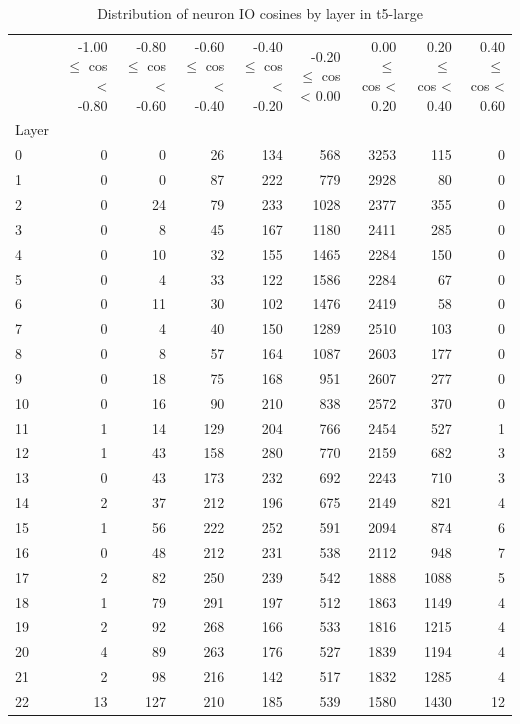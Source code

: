 \begin{table}
\caption{Distribution of neuron IO cosines by layer in t5-large}
\label{tab:t5-large_half_coarse}
\begin{tabular}{lrrrrrrrr}
 & -1.00 $\leq$ cos < -0.80 & -0.80 $\leq$ cos < -0.60 & -0.60 $\leq$ cos < -0.40 & -0.40 $\leq$ cos < -0.20 & -0.20 $\leq$ cos < 0.00 & 0.00 $\leq$ cos < 0.20 & 0.20 $\leq$ cos < 0.40 & 0.40 $\leq$ cos < 0.60 \\
Layer &  &  &  &  &  &  &  &  \\
0 & 0 & 0 & 26 & 134 & 568 & 3253 & 115 & 0 \\
1 & 0 & 0 & 87 & 222 & 779 & 2928 & 80 & 0 \\
2 & 0 & 24 & 79 & 233 & 1028 & 2377 & 355 & 0 \\
3 & 0 & 8 & 45 & 167 & 1180 & 2411 & 285 & 0 \\
4 & 0 & 10 & 32 & 155 & 1465 & 2284 & 150 & 0 \\
5 & 0 & 4 & 33 & 122 & 1586 & 2284 & 67 & 0 \\
6 & 0 & 11 & 30 & 102 & 1476 & 2419 & 58 & 0 \\
7 & 0 & 4 & 40 & 150 & 1289 & 2510 & 103 & 0 \\
8 & 0 & 8 & 57 & 164 & 1087 & 2603 & 177 & 0 \\
9 & 0 & 18 & 75 & 168 & 951 & 2607 & 277 & 0 \\
10 & 0 & 16 & 90 & 210 & 838 & 2572 & 370 & 0 \\
11 & 1 & 14 & 129 & 204 & 766 & 2454 & 527 & 1 \\
12 & 1 & 43 & 158 & 280 & 770 & 2159 & 682 & 3 \\
13 & 0 & 43 & 173 & 232 & 692 & 2243 & 710 & 3 \\
14 & 2 & 37 & 212 & 196 & 675 & 2149 & 821 & 4 \\
15 & 1 & 56 & 222 & 252 & 591 & 2094 & 874 & 6 \\
16 & 0 & 48 & 212 & 231 & 538 & 2112 & 948 & 7 \\
17 & 2 & 82 & 250 & 239 & 542 & 1888 & 1088 & 5 \\
18 & 1 & 79 & 291 & 197 & 512 & 1863 & 1149 & 4 \\
19 & 2 & 92 & 268 & 166 & 533 & 1816 & 1215 & 4 \\
20 & 4 & 89 & 263 & 176 & 527 & 1839 & 1194 & 4 \\
21 & 2 & 98 & 216 & 142 & 517 & 1832 & 1285 & 4 \\
22 & 13 & 127 & 210 & 185 & 539 & 1580 & 1430 & 12 \\

\end{tabular}
\end{table}
